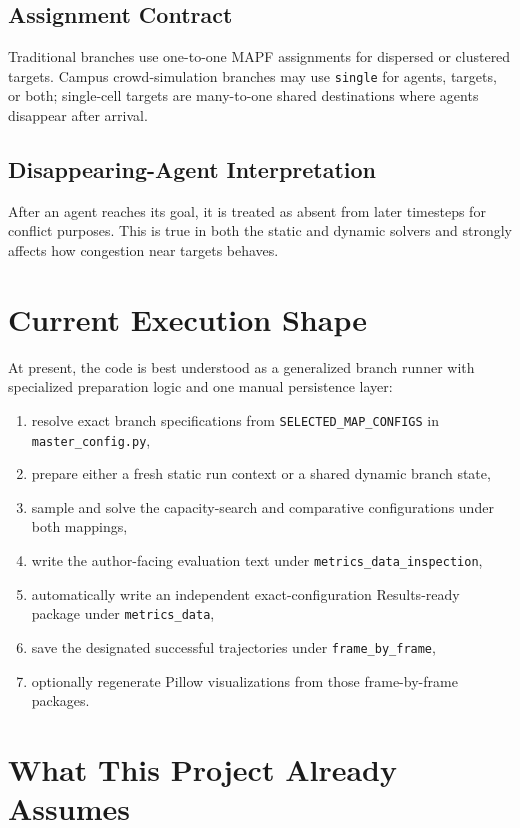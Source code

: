 \documentclass[11pt]{article}
\begin{document}
\subsection{Assignment Contract}

Traditional branches use one-to-one MAPF assignments for dispersed or clustered targets. Campus crowd-simulation branches may use \texttt{single} for agents, targets, or both; single-cell targets are many-to-one shared destinations where agents disappear after arrival.

\subsection{Disappearing-Agent Interpretation}

After an agent reaches its goal, it is treated as absent from later timesteps for conflict purposes. This is true in both the static and dynamic solvers and strongly affects how congestion near targets behaves.

\section{Current Execution Shape}

At present, the code is best understood as a generalized branch runner with specialized preparation logic and one manual persistence layer:
\begin{enumerate}[leftmargin=2em]
    \item resolve exact branch specifications from \texttt{SELECTED\_MAP\_CONFIGS} in \texttt{master\_config.py},
    \item prepare either a fresh static run context or a shared dynamic branch state,
    \item sample and solve the capacity-search and comparative configurations under both mappings,
    \item write the author-facing evaluation text under \texttt{metrics\_data\_inspection},
    \item automatically write an independent exact-configuration Results-ready package under \texttt{metrics\_data},
    \item save the designated successful trajectories under \texttt{frame\_by\_frame},
    \item optionally regenerate Pillow visualizations from those frame-by-frame packages.
\end{enumerate}

\section{What This Project Already Assumes}
\end{document}
